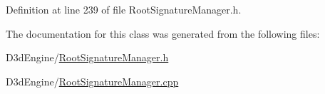 Definition at line 239 of file Root\+Signature\+Manager.\+h.



The documentation for this class was generated from the following files\+:\begin{DoxyCompactItemize}
\item 
D3d\+Engine/\mbox{\hyperlink{_root_signature_manager_8h}{Root\+Signature\+Manager.\+h}}\item 
D3d\+Engine/\mbox{\hyperlink{_root_signature_manager_8cpp}{Root\+Signature\+Manager.\+cpp}}\end{DoxyCompactItemize}
